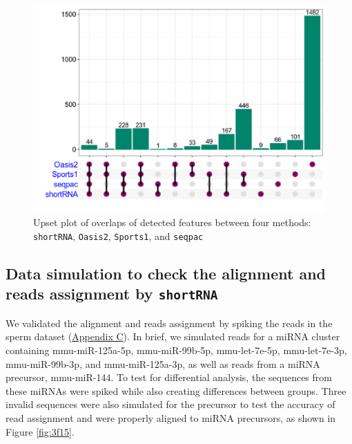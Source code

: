\documentclass[12pt,twoside]{reedthesis}
\begin{document}
\begin{figure}[htbp]

{\centering \includegraphics{thesis_files/figure-latex/3f14-1} 

}

\caption{Upset plot of overlaps of detected features between four
methods: \texttt{shortRNA}, \texttt{Oasis2}, \texttt{Sports1}, and \texttt{seqpac}}\label{fig:3f14}
\end{figure}
\hypertarget{data-simulation-to-check-the-alignment-and-reads-assignment-by-shortrna}{%
\subsection{\texorpdfstring{Data simulation to check the alignment and reads assignment by \texttt{shortRNA}}{Data simulation to check the alignment and reads assignment by shortRNA}}\label{data-simulation-to-check-the-alignment-and-reads-assignment-by-shortrna}}

We validated the alignment and reads assignment by spiking the reads in
the sperm dataset (\protect\hyperlink{ac}{Appendix C}). In brief, we simulated reads for
a miRNA cluster containing mmu-miR-125a-5p, mmu-miR-99b-5p,
mmu-let-7e-5p, mmu-let-7e-3p, mmu-miR-99b-3p, and mmu-miR-125a-3p, as
well as reads from a miRNA precursor, mmu-miR-144. To test for
differential analysis, the sequences from these miRNAs were spiked while
also creating differences between groups. Three invalid sequences were
also simulated for the precursor to test the accuracy of read assignment
and were properly aligned to miRNA precursors, as shown in Figure
\ref{fig:3f15}.
\end{document}
